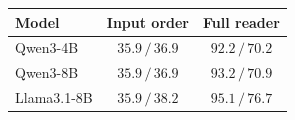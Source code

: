 \begingroup\renewcommand{\arraystretch}{1.08}
\begin{tabular}{@{}lcc@{}}
\toprule
\textbf{Model} & \textbf{Input order} & \textbf{Full reader} \\
\midrule
Qwen3-4B & $35.9\,/\,36.9$ & $\mathbf{92.2}\,/\,\mathbf{70.2}$ \\
Qwen3-8B & $35.9\,/\,36.9$ & $\mathbf{93.2}\,/\,\mathbf{70.9}$ \\
Llama3.1-8B & $35.9\,/\,38.2$ & $\mathbf{95.1}\,/\,\mathbf{76.7}$ \\
\bottomrule
\end{tabular}
\endgroup
